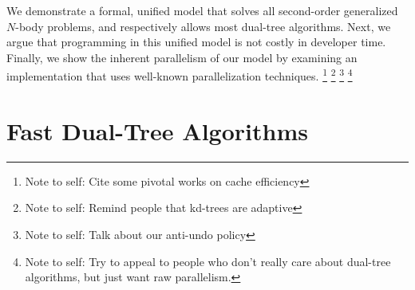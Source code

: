 \documentclass[twoside,leqno,twocolumn]{article}
\newcommand{\authornote}[1]{\footnote{Note to self: #1}}
\newcommand{\authorsnote}[1]{\authornote{#1}}
\begin{document}
We demonstrate a formal, unified model that solves all second-order generalized $N$-body problems, and respectively allows most dual-tree algorithms.
Next, we argue that programming in this unified model is not costly in developer time.
Finally, we show the inherent parallelism of our model by examining an implementation that uses well-known parallelization techniques.
\authorsnote{Cite some pivotal works on cache efficiency}
\authorsnote{Remind people that kd-trees are adaptive}
\authorsnote{Talk about our anti-undo policy}
\authorsnote{Try to appeal to people who don't really care about dual-tree algorithms, but just want raw parallelism.}

\section{Fast Dual-Tree Algorithms}
\end{document}
